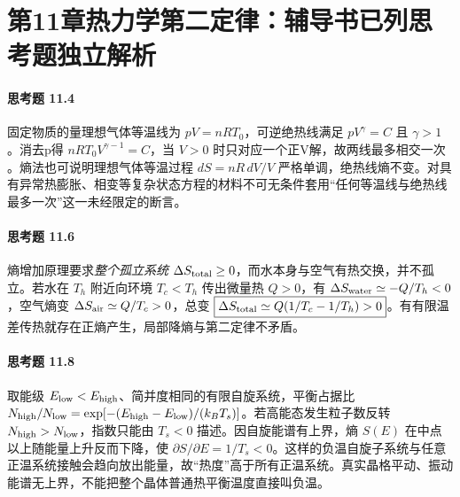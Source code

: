 \section*{第11章\quad 热力学第二定律：辅导书已列思考题独立解析}
\paragraph{思考题 11.4}
固定物质的量理想气体等温线为 \(pV=nRT_0\)，可逆绝热线满足 \(pV^\gamma=C\) 且 \(\gamma>1\)。消去p得 \(nRT_0 V^{\gamma-1}=C\)，当 \(V>0\) 时只对应一个正V解，故\(\boxed{\text{两线最多相交一次}}\)。熵法也可说明理想气体等温过程 \(dS=nR\,dV/V\) 严格单调，绝热线熵不变。对具有异常热膨胀、相变等复杂状态方程的材料不可无条件套用“任何等温线与绝热线最多一次”这一未经限定的断言。

\paragraph{思考题 11.6}
熵增加原理要求\emph{整个孤立系统} \(\Delta S_{\rm total}\ge0\)，而水本身与空气有热交换，并不孤立。若水在 \(T_h\) 附近向环境 \(T_c<T_h\) 传出微量热 \(Q>0\)，有 \(\Delta S_{\rm water}\simeq-Q/T_h<0\)，空气熵变 \(\Delta S_{\rm air}\simeq Q/T_c>0\)，总变 \(\boxed{\Delta S_{\rm total}\simeq Q(1/T_c-1/T_h)>0}\)。有有限温差传热就存在正熵产生，局部降熵与第二定律不矛盾。

\paragraph{思考题 11.8}
取能级 \(E_{\rm low}<E_{\rm high}\)、简并度相同的有限自旋系统，平衡占据比 \(N_{\rm high}/N_{\rm low}=\exp[-(E_{\rm high}-E_{\rm low})/(k_BT_s)]\)。若高能态发生粒子数反转 \(N_{\rm high}>N_{\rm low}\)，指数只能由 \(\boxed{T_s<0}\) 描述。因自旋能谱有上界，熵 \(S(E)\) 在中点以上随能量上升反而下降，使 \(\partial S/\partial E=1/T_s<0\)。这样的负温自旋子系统与任意正温系统接触会趋向放出能量，故“热度”高于所有正温系统。真实晶格平动、振动能谱无上界，不能把整个晶体普通热平衡温度直接叫负温。
